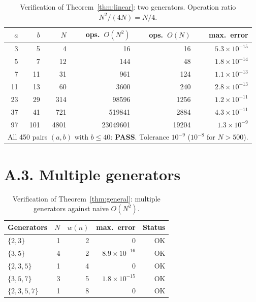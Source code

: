 \begin{table}[H]
\centering
\begin{tabular}{rrrrrr}
\toprule
$a$ & $b$ & $N$ & ops.\ $O(N^2)$ & ops.\ $O(N)$ & max.\ error \\
\midrule
  3 &   5 &     4 &          16 &        16 & $5{.}3\times10^{-15}$ \\
  5 &   7 &    12 &         144 &        48 & $1{.}8\times10^{-14}$ \\
  7 &  11 &    31 &         961 &       124 & $1{.}1\times10^{-13}$ \\
 11 &  13 &    60 &        3600 &       240 & $2{.}8\times10^{-13}$ \\
 23 &  29 &   314 &       98596 &      1256 & $1{.}2\times10^{-11}$ \\
 37 &  41 &   721 &      519841 &      2884 & $4{.}3\times10^{-11}$ \\
 97 & 101 &  4801 &   23049601 &     19204 & $1{.}3\times10^{-9}$  \\
\bottomrule
\multicolumn{6}{l}{\footnotesize All 450 pairs $(a,b)$ with $b \leq 40$: \textbf{PASS}.
  Tolerance $10^{-9}$ ($10^{-8}$ for $N > 500$).}
\end{tabular}
\caption{Verification of Theorem~\ref{thm:linear}: two generators.
Operation ratio $N^2/(4N) = N/4$.}
\label{tab:two-gen}
\end{table}

\section*{A.3. Multiple generators}
\label{subsec:a3-multiple}

\begin{table}[H]
\centering
\begin{tabular}{lrrrr}
\toprule
Generators & $N$ & $w(n)$ & max.\ error & Status \\
\midrule
$\{2,3\}$     & 1 & 2 & $0$                   & OK \\
$\{3,5\}$     & 4 & 2 & $8{.}9\times10^{-16}$ & OK \\
$\{2,3,5\}$   & 1 & 4 & $0$                   & OK \\
$\{3,5,7\}$   & 3 & 5 & $1{.}8\times10^{-15}$ & OK \\
$\{2,3,5,7\}$ & 1 & 8 & $0$                   & OK \\
\bottomrule
\end{tabular}
\caption{Verification of Theorem~\ref{thm:general}: multiple generators
against naive $O(N^2)$.}
\label{tab:multi-gen}
\end{table}

